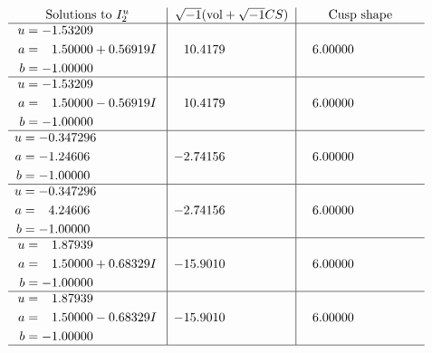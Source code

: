 \documentclass[1p]{elsarticle_modified}
\theoremstyle{definition}
\newcommand{\I}{\sqrt{-1}}
\begin{document}
$$\begin{array}{c|c|c}  
\text{Solutions to }I^u_{2}& \I (\text{vol} + \sqrt{-1}CS) & \text{Cusp shape}\\
 \hline 
\begin{aligned}
u &= -1.53209\phantom{ +0.000000I} \\
a &= \phantom{-}1.50000 + 0.56919 I \\
b &= -1.00000\phantom{ +0.000000I}\end{aligned}
 & \phantom{-}10.4179\phantom{ +0.000000I} & \phantom{-}6.00000\phantom{ +0.000000I} \\ \hline\begin{aligned}
u &= -1.53209\phantom{ +0.000000I} \\
a &= \phantom{-}1.50000 - 0.56919 I \\
b &= -1.00000\phantom{ +0.000000I}\end{aligned}
 & \phantom{-}10.4179\phantom{ +0.000000I} & \phantom{-}6.00000\phantom{ +0.000000I} \\ \hline\begin{aligned}
u &= -0.347296\phantom{ +0.000000I} \\
a &= -1.24606\phantom{ +0.000000I} \\
b &= -1.00000\phantom{ +0.000000I}\end{aligned}
 & -2.74156\phantom{ +0.000000I} & \phantom{-}6.00000\phantom{ +0.000000I} \\ \hline\begin{aligned}
u &= -0.347296\phantom{ +0.000000I} \\
a &= \phantom{-}4.24606\phantom{ +0.000000I} \\
b &= -1.00000\phantom{ +0.000000I}\end{aligned}
 & -2.74156\phantom{ +0.000000I} & \phantom{-}6.00000\phantom{ +0.000000I} \\ \hline\begin{aligned}
u &= \phantom{-}1.87939\phantom{ +0.000000I} \\
a &= \phantom{-}1.50000 + 0.68329 I \\
b &= -1.00000\phantom{ +0.000000I}\end{aligned}
 & -15.9010\phantom{ +0.000000I} & \phantom{-}6.00000\phantom{ +0.000000I} \\ \hline\begin{aligned}
u &= \phantom{-}1.87939\phantom{ +0.000000I} \\
a &= \phantom{-}1.50000 - 0.68329 I \\
b &= -1.00000\phantom{ +0.000000I}\end{aligned}
 & -15.9010\phantom{ +0.000000I} & \phantom{-}6.00000\phantom{ +0.000000I}\\
 \hline 
 \end{array}$$\newpage\newpage\renewcommand{\arraystretch}{1}
\end{document}
